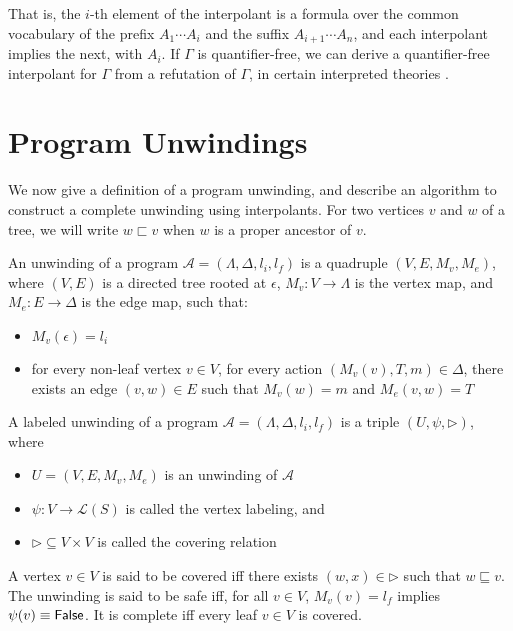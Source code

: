 That is, the $i$-th element of the interpolant is a formula over the common vocabulary of
the prefix $A_1 \cdots A_i$ and the suffix $A_{i+1} \cdots A_n$, and each interpolant
implies the next, with $A_i$. If $\Gamma$ is quantifier-free, we can derive a
quantifier-free interpolant for $\Gamma$ from a refutation of $\Gamma$, in certain
interpreted theories \cite{mcmillan05}.

\section{Program Unwindings}

We now give a definition of a program unwinding, and describe an algorithm to construct a
complete unwinding using interpolants. For two vertices $v$ and $w$ of a tree, we will
write $w \sqsubset v$ when $w$ is a proper ancestor of $v$.

\begin{defn}
  \label{defn:prog-unwinding}
  An unwinding of a program $\mathcal{A} = (\Lambda, \Delta, l_i, l_f)$ is a quadruple $(V, E, M_v, M_e)$, where $(V, E)$ is a directed tree rooted at $\epsilon$, $M_v : V \rightarrow \Lambda$ is the vertex map, and $M_e : E \rightarrow \Delta$ is the edge map, such that:

  \begin{itemize}
    \item $M_v(\epsilon) = l_i$
    \item for every non-leaf vertex $v \in V$, for every action $(M_v(v), T, m) \in \Delta$, there exists an edge $(v,w) \in E$ such that $M_v(w) = m$ and $M_e(v,w) = T$
  \end{itemize}
\end{defn}

\begin{defn}
  \label{defn:labeled-prog-unwinding}
  A labeled unwinding of a program $\mathcal{A} = (\Lambda, \Delta, l_i, l_f)$ is a triple $(U, \psi, \rhd)$, where

  \begin{itemize}
    \item $U = (V, E, M_v, M_e)$ is an unwinding of $\mathcal{A}$
    \item $\psi : V \rightarrow \mathcal{L}(S)$ is called the vertex labeling, and
    \item $\rhd \subseteq V \times V$ is called the covering relation
  \end{itemize}

  A vertex $v \in V$ is said to be covered iff there exists $(w,x) \in \rhd$ such that $w \sqsubseteq v$. The unwinding is said to be safe iff, for all $v \in V$, $M_v(v) = l_f$ implies $\psi(v) \equiv \mathsf{False}$. It is complete iff every leaf $v \in V$ is covered.
\end{defn}

